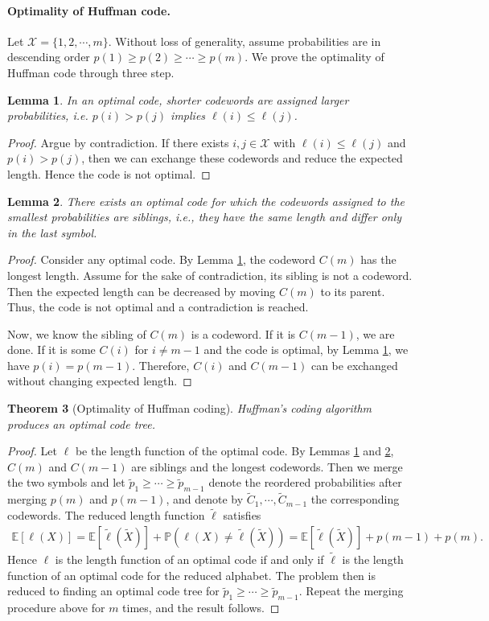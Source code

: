\documentclass{article}
\numberwithin{equation}{section}
\newcommand{\E}{\mathbb{E}}
\newcommand{\bbP}{\mathbb{P}}
\renewcommand{\cal}{\mathcal}
\newcommand{\wt}{\widetilde}
\theoremstyle{plain}
\newtheorem{theorem}{Theorem}[section]
\newtheorem{lemma}[theorem]{Lemma}
\theoremstyle{definition}
\begin{document}
\paragraph{Optimality of Huffman code.} Let $\cal{X}=\{1,2,\cdots,m\}$. Without loss of generality, assume probabilities are in descending order $p(1)\geq p(2)\geq \cdots\geq p(m)$. We prove the optimality of Huffman code through three step.
\begin{lemma}\label{huffman1}
In an optimal code, shorter codewords are assigned larger probabilities, i.e.
$p(i)>p(j)$ implies $\ell(i)\leq\ell(j)$.
\end{lemma}
\begin{proof}
Argue by contradiction. If there exists $i,j\in\cal{X}$ with $\ell(i)\leq\ell(j)$ and $p(i)>p(j)$, then we can exchange these codewords
and reduce the expected length. Hence the code is not optimal.
\end{proof}

\begin{lemma}\label{huffman2}
There exists an optimal code for which the codewords assigned to the smallest
probabilities are siblings, i.e., they have the same length and differ only in the last symbol.
\end{lemma}
\begin{proof}
Consider any optimal code. By Lemma \ref{huffman1}, the codeword $C(m)$ has the longest length. Assume for the sake of contradiction, its sibling is not a codeword. Then the expected length can be decreased by moving $C(m)$ to its parent. Thus, the code is not optimal and a contradiction is reached.

Now, we know the sibling of $C(m)$ is a codeword. If it is $C(m-1)$, we are done. If it is some $C(i)$ for $i\neq m-1$ and the code is optimal, by Lemma \ref{huffman1}, we have $p(i) = p(m-1)$. Therefore, $C(i)$ and $C(m-1)$ can be exchanged without changing expected length.
\end{proof}

\begin{theorem}[Optimality of Huffman coding]
Huffman’s coding algorithm produces an optimal code tree.
\end{theorem}
\begin{proof}
Let $\ell$ be the length function of the optimal code. By Lemmas \ref{huffman1} and \ref{huffman2}, $C(m)$ and $C(m-1)$ are siblings and the longest codewords. Then we merge the two symbols and let $\wt{p}_1\geq\cdots\geq\wt{p}_{m-1}$ denote the reordered probabilities after merging $p(m)$ and $p(m-1)$, and denote by $\wt{C}_1,\cdots,\wt{C}_{m-1}$ the corresponding codewords. The reduced length function $\wt{\ell}$ satisfies
\begin{align*}
	\E\left[\ell(X)\right]=\E\left[\wt{\ell}(\wt{X})\right]+\bbP\left(\ell(X)\neq\wt{\ell}(\wt{X})\right)=\E\left[\wt{\ell}(\wt{X})\right]+p(m-1)+p(m).
\end{align*}
Hence $\ell$ is the length function of an optimal code if and only if $\wt{\ell}$ is the length function of an optimal code for the reduced alphabet. The problem then is reduced to finding an optimal code tree for $\wt{p}_1\geq\cdots\geq\wt{p}_{m-1}$. Repeat the merging 	procedure above for $m$ times, and the result follows.
\end{proof}
\end{document}
